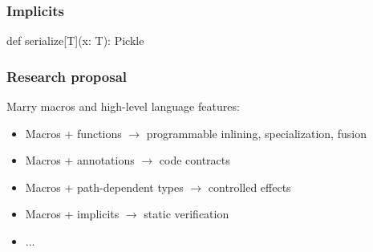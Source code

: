 \documentclass[hyperref={bookmarks=false}]{beamer}
\begin{document}
\begin{frame}[fragile]
\frametitle{Implicits}
\begin{semiverbatim}
def serialize[T](x: T): Pickle

\end{semiverbatim}
\end{frame}

\begin{frame}[fragile]
\frametitle{Research proposal}

Marry macros and high-level language features:

\begin{itemize}
\item Macros + functions $\rightarrow$ programmable inlining, specialization, fusion
\item Macros + annotations $\rightarrow$ code contracts
\item Macros + path-dependent types $\rightarrow$ controlled effects
\item Macros + implicits $\rightarrow$ static verification
\item ...
\end{itemize}
\end{frame}
\end{document}
